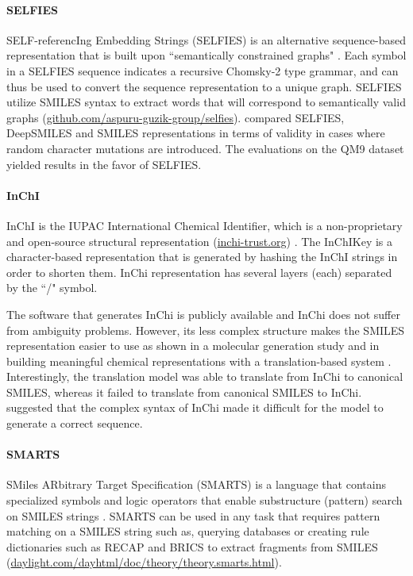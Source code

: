 \documentclass[review]{elsarticle}
\begin{document}
\paragraph{SELFIES} SELF-referencIng Embedding Strings (SELFIES) is an alternative sequence-based representation that is built upon ``semantically constrained graphs" \cite{krenn2019selfies}. Each symbol in a SELFIES sequence indicates a recursive Chomsky-2 type grammar, and can thus be used to convert the sequence representation to a unique graph. SELFIES utilize SMILES syntax to extract words that will correspond to  semantically valid graphs (\url{github.com/aspuru-guzik-group/selfies}). \citet{krenn2019selfies} compared SELFIES, DeepSMILES and SMILES representations in terms of validity in cases where random character mutations are introduced. The evaluations on the QM9 dataset yielded results in the favor of SELFIES. 

\paragraph{InChI} InChI is the IUPAC International Chemical Identifier, which is a non-proprietary and open-source structural representation (\url{inchi-trust.org}) \cite{heller2015inchi}. The InChIKey is a character-based representation that is generated by hashing the InChI strings in order to shorten them.  InChi representation has several layers (each) separated by the ``/" symbol.  

The software that generates InChi is publicly available and InChi does not suffer from ambiguity problems. However, its less complex structure makes the SMILES representation easier to use as shown in a  molecular generation study \cite{gomez2018automatic} and in building meaningful chemical representations with a translation-based system   \cite{winter2019learning}. Interestingly, the translation model was able to translate from InChi to canonical SMILES, whereas it failed to translate from canonical SMILES to InChi. \citet{winter2019learning} suggested that the complex syntax of InChi made it difficult for the model to generate a correct sequence. 

\paragraph{SMARTS} SMiles ARbitrary Target Specification (SMARTS) is a language that contains specialized symbols and logic operators that enable  substructure (pattern) search on SMILES strings \cite{ghersi2014molblocks}.  SMARTS can be used in any task that requires pattern matching on a SMILES string such as, querying databases or creating rule dictionaries such as RECAP \cite{lewell1998recap} and BRICS \cite{degen2008art} to extract fragments from SMILES (\url{daylight.com/dayhtml/doc/theory/theory.smarts.html}).
\end{document}
